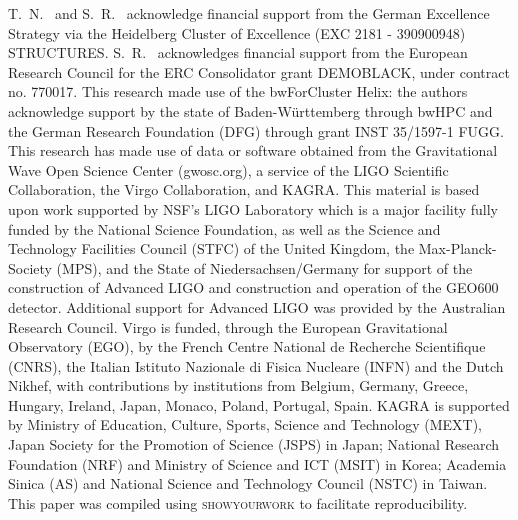 \documentclass[twocolumn]{aastex631}
\begin{document}
\begin{acknowledgments}

T.~N.~ and S.~R.~ acknowledge financial support from the German Excellence Strategy via the Heidelberg Cluster of Excellence (EXC 2181 - 390900948) STRUCTURES.
S.~R.~ acknowledges financial support from the European Research Council for the ERC Consolidator grant DEMOBLACK, under contract no. 770017. 
This research made use of the bwForCluster Helix: the authors acknowledge support by the state of Baden-Württemberg through bwHPC and the German Research Foundation (DFG) through grant INST 35/1597-1 FUGG.
This research has made use of data or software obtained from the Gravitational Wave Open Science Center (gwosc.org), a service of the LIGO Scientific Collaboration, the Virgo Collaboration, and KAGRA. This material is based upon work supported by NSF's LIGO Laboratory which is a major facility fully funded by the National Science Foundation, as well as the Science and Technology Facilities Council (STFC) of the United Kingdom, the Max-Planck-Society (MPS), and the State of Niedersachsen/Germany for support of the construction of Advanced LIGO and construction and operation of the GEO600 detector. Additional support for Advanced LIGO was provided by the Australian Research Council. Virgo is funded, through the European Gravitational Observatory (EGO), by the French Centre National de Recherche Scientifique (CNRS), the Italian Istituto Nazionale di Fisica Nucleare (INFN) and the Dutch Nikhef, with contributions by institutions from Belgium, Germany, Greece, Hungary, Ireland, Japan, Monaco, Poland, Portugal, Spain. KAGRA is supported by Ministry of Education, Culture, Sports, Science and Technology (MEXT), Japan Society for the Promotion of Science (JSPS) in Japan; National Research Foundation (NRF) and Ministry of Science and ICT (MSIT) in Korea; Academia Sinica (AS) and National Science and Technology Council (NSTC) in Taiwan.
This paper was compiled using \textsc{showyourwork} \cite{Luger2021} to facilitate reproducibility.

\end{acknowledgments}


\end{document}
